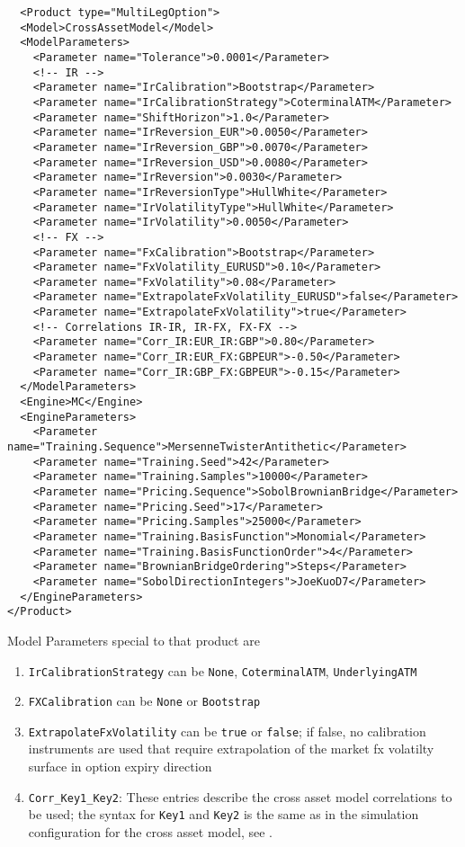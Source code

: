 \documentclass[12pt, a4paper]{article}
\begin{document}
\begin{verbatim}
  <Product type="MultiLegOption">
  <Model>CrossAssetModel</Model>
  <ModelParameters>
    <Parameter name="Tolerance">0.0001</Parameter>
    <!-- IR -->
    <Parameter name="IrCalibration">Bootstrap</Parameter>
    <Parameter name="IrCalibrationStrategy">CoterminalATM</Parameter>
    <Parameter name="ShiftHorizon">1.0</Parameter>
    <Parameter name="IrReversion_EUR">0.0050</Parameter>
    <Parameter name="IrReversion_GBP">0.0070</Parameter>
    <Parameter name="IrReversion_USD">0.0080</Parameter>
    <Parameter name="IrReversion">0.0030</Parameter>
    <Parameter name="IrReversionType">HullWhite</Parameter>
    <Parameter name="IrVolatilityType">HullWhite</Parameter>
    <Parameter name="IrVolatility">0.0050</Parameter>
    <!-- FX -->
    <Parameter name="FxCalibration">Bootstrap</Parameter>
    <Parameter name="FxVolatility_EURUSD">0.10</Parameter>
    <Parameter name="FxVolatility">0.08</Parameter>
    <Parameter name="ExtrapolateFxVolatility_EURUSD">false</Parameter>
    <Parameter name="ExtrapolateFxVolatility">true</Parameter>
    <!-- Correlations IR-IR, IR-FX, FX-FX -->
    <Parameter name="Corr_IR:EUR_IR:GBP">0.80</Parameter>
    <Parameter name="Corr_IR:EUR_FX:GBPEUR">-0.50</Parameter>
    <Parameter name="Corr_IR:GBP_FX:GBPEUR">-0.15</Parameter>
  </ModelParameters>
  <Engine>MC</Engine>
  <EngineParameters>
    <Parameter name="Training.Sequence">MersenneTwisterAntithetic</Parameter>
    <Parameter name="Training.Seed">42</Parameter>
    <Parameter name="Training.Samples">10000</Parameter>
    <Parameter name="Pricing.Sequence">SobolBrownianBridge</Parameter>
    <Parameter name="Pricing.Seed">17</Parameter>
    <Parameter name="Pricing.Samples">25000</Parameter>
    <Parameter name="Training.BasisFunction">Monomial</Parameter>
    <Parameter name="Training.BasisFunctionOrder">4</Parameter>
    <Parameter name="BrownianBridgeOrdering">Steps</Parameter>
    <Parameter name="SobolDirectionIntegers">JoeKuoD7</Parameter>
  </EngineParameters>
</Product>
\end{verbatim}

Model Parameters special to that product are

\begin{enumerate}
\item \verb+IrCalibrationStrategy+ can be \verb+None+, \verb+CoterminalATM+, \verb+UnderlyingATM+
\item \verb+FXCalibration+ can be \verb+None+ or \verb+Bootstrap+
\item \verb+ExtrapolateFxVolatility+ can be \verb+true+ or \verb+false+; if false, no calibration instruments are used
  that require extrapolation of the market fx volatilty surface in option expiry direction
\item \verb+Corr_Key1_Key2+: These entries describe the cross asset model correlations to be used; the syntax for
  \verb+Key1+ and \verb+Key2+ is the same as in the simulation configuration for the cross asset model, see \cite{oreug}.
\end{enumerate}
\end{document}
